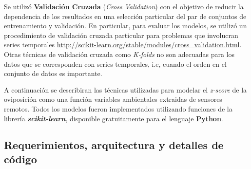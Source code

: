   \par Se utilizó \textbf{Validación Cruzada}
    (\textit{Cross Validation}) \cite{cross_validation, ml_rainfall} con el
    objetivo de reducir la dependencia de los resultados en una selección particular
    del par de conjuntos de entrenamiento y validación. En particular, para
    evaluar los modelos, se utilizó un procedimiento de validación cruzada
    particular para problemas que involucran series temporales
    \url{http://scikit-learn.org/stable/modules/cross_validation.html}.
    Otras técnicas de validación cruzada como \textit{K-folds} no son
    adecuadas para los datos que se corresponden con series temporales, i.e,
    cuando el orden en el conjunto de datos es importante.

    \par A continuación se describiran las técnicas utilizadas para modelar
    el \textit{z-score} de la oviposición como una función variables ambientales
    extraidas de sensores remotos. Todos los modelos fueron implementados utilizando
    funciones de la librería \textbf{\textit{scikit-learn}}, disponible
    gratuitamente para el lenguaje \textbf{Python}.


    \subsection{Requerimientos, arquitectura y detalles de código}

